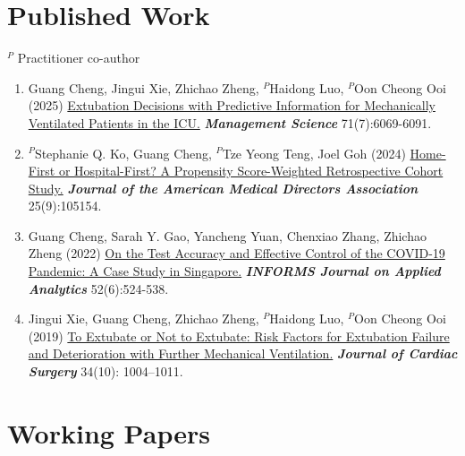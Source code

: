 \documentclass[12pt, a4paper]{article}
\begin{document}
{\section*{Published Work}

\raggedright{\footnotesize{$^P$ Practitioner co-author}}
\vspace{-12pt}

\begin{enumerate}

	\item Guang Cheng, Jingui Xie, Zhichao Zheng, $^P$Haidong Luo, $^P$Oon Cheong Ooi (2025)
	\href{https://doi.org/10.1287/mnsc.2021.01427}{Extubation Decisions with Predictive Information for Mechanically Ventilated Patients in the ICU.}
	\textit{\textbf{Management Science}} 71(7):6069-6091.
	
	\item $^P$Stephanie Q. Ko, Guang Cheng, $^P$Tze Yeong Teng, Joel Goh (2024)
	\href{https://doi.org/10.1016/j.jamda.2024.105154}{Home-First or Hospital-First? A Propensity Score-Weighted Retrospective Cohort Study.}
	\textit{\textbf{Journal of the American Medical Directors Association}} 25(9):105154.
	
	\item Guang Cheng, Sarah Y. Gao, Yancheng Yuan, Chenxiao Zhang, Zhichao Zheng (2022) 
	\href{https://doi.org/10.1287/inte.2022.1117}{On the Test Accuracy and Effective Control of the COVID-19 Pandemic: A Case Study in Singapore.} 
	\textit{\textbf{INFORMS Journal on Applied Analytics}} 52(6):524-538.

	\item Jingui Xie, Guang Cheng, Zhichao Zheng, $^P$Haidong Luo, $^P$Oon Cheong Ooi (2019) 
	\href{https://doi.org/10.1111/jocs.14189}{To Extubate or Not to Extubate: Risk Factors for Extubation Failure and Deterioration with Further Mechanical Ventilation.}
	\textit{\textbf{Journal of Cardiac Surgery}} 34(10): 1004–1011.

\end{enumerate}




\section*{Working Papers}

}
\end{document}
